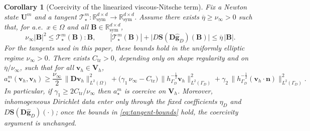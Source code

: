 \documentclass[DIV=16]{scrartcl}
\newtheorem{corollary}[theorem]{Corollary}
\DeclareMathOperator{\sym}{sym}
\newcommand{\uu}{\boldsymbol v}
\newcommand{\nn}{\boldsymbol n}
\newcommand{\DD}{\boldsymbol D} %
\newcommand{\Sstress}{\boldsymbol S} %
\newcommand{\GhD}{\Gamma_{D}}
\newcommand{\Vh}{\boldsymbol V_h}
\newcommand{\gOne}{\gamma_{1}}  %
\newcommand{\gTwo}{\gamma_{2}}  %
\newcommand{\hGD}{h_{\Gamma_D}} %
\newcommand{\DStress}[2]{D\Sstress \left(#1\right) \left(#2\right)}
\begin{document}
\begin{corollary}[Coercivity of the linearized viscous-Nitsche term]\label{cor:linearized-viscous-coercive}
Fix a Newton state $\bm U^m$ and a tangent
$\mathcal T_\star^m:\mathbb{R}^{d\times d}_{\sym}\to\mathbb{R}^{d\times d}_{\sym}$.
Assume there exists $\overline\eta\ge \nu_\infty>0$ such that, for a.e.\ $x\in\Omega$ and all
$\bm B\in\mathbb{R}^{d\times d}_{\sym}$,
\begin{equation}\label{eq:tangent-bounds}
  \nu_\infty |\bm B|^2 \le \mathcal T_\star^m(\bm B):\bm B,
  \qquad
  |\mathcal T_\star^m(\bm B)|+\bigl|\DStress{\DD\hat{\boldsymbol g}_D}{\bm B}\bigr|
  \le \overline\eta\,|\bm B|.
\end{equation}
For the tangents used in this paper, these bounds hold in the uniformly elliptic
regime $\nu_\infty>0$.
There exists $C_{\mathrm{tr}}>0$, depending only on shape regularity and on
$\overline\eta/\nu_\infty$, such that for all $\uu_h\in\Vh$,
\begin{equation}\label{eq:am-coercive}
  a_{\star}^m(\uu_h,\uu_h)
  \ge \frac{\nu_{\infty}}{2}\,\|\DD\uu_h\|_{L^2(\Omega)}^2
  +\bigl(\gOne\,\nu_{\infty}-C_{\mathrm{tr}}\bigr)\,\|\hGD^{-\frac12}\uu_h\|_{L^2(\GhD)}^2
  +\gTwo\,\|\hGD^{-\frac12}(\uu_h\cdot\nn)\|_{L^2(\GhD)}^2.
\end{equation}
In particular, if $\gOne\ge 2C_{\mathrm{tr}}/\nu_{\infty}$ then $a_\star^m$ is
coercive on $\Vh$.
Moreover, inhomogeneous Dirichlet data enter only through the fixed
coefficients $\eta_D$ and $\DStress{\DD\hat{\boldsymbol g}_D}{\cdot}$; once the
bounds in \eqref{eq:tangent-bounds} hold, the coercivity argument is unchanged.
\end{corollary}
\end{document}
